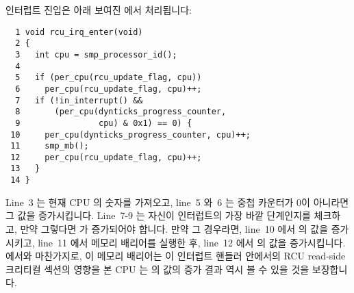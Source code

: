인터럽트 진입은 아래 보여진  에서 처리됩니다:
\iffalse

The \co{rcu_irq_enter()} and \co{rcu_irq_exit()}
functions handle interrupt/NMI entry and exit, respectively.
Of course, nested interrupts must also be properly accounted for.
The possibility of nested interrupts is handled by a second per-CPU
variable, \co{rcu_update_flag}, which is incremented upon
entry to an interrupt or NMI handler (in \co{rcu_irq_enter()})
and is decremented upon exit (in \co{rcu_irq_exit()}).
In addition, the pre-existing \co{in_interrupt()} primitive is
used to distinguish between an outermost or a nested interrupt/NMI.

Interrupt entry is handled by the \co{rcu_irq_enter()}
shown below:
\fi

{ \scriptsize
\begin{verbatim}
  1 void rcu_irq_enter(void)
  2 {
  3   int cpu = smp_processor_id();
  4
  5   if (per_cpu(rcu_update_flag, cpu))
  6     per_cpu(rcu_update_flag, cpu)++;
  7   if (!in_interrupt() &&
  8       (per_cpu(dynticks_progress_counter,
  9                cpu) & 0x1) == 0) {
 10     per_cpu(dynticks_progress_counter, cpu)++;
 11     smp_mb();
 12     per_cpu(rcu_update_flag, cpu)++;
 13   }
 14 }
\end{verbatim}
}

Line~3 는 현재 CPU 의 숫자를 가져오고, line~5 와~6 는  중첩
카운터가 0이 아니라면 그 값을 증가시킵니다.
Line~7-9 는 자신이 인터럽트의 가장 바깥 단계인지를 체크하고, 만약 그렇다면
 가 증가되어야 합니다.
만약 그 경우라면, line~10 에서  의 값을
증가시키고, line~11 에서 메모리 배리어를 실행한 후, line~12 에서
 의 값을 증가시킵니다.
 에서와 마찬가지로, 이 메모리 배리어는 이 인터럽트 핸들러
안에서의 RCU read-side 크리티컬 섹션의 영향을 본 CPU 는
 의 값의 증가 결과 역시 볼 수 있을 것을
보장합니다.
\iffalse

Line~3 fetches the current CPU's number, while lines~5 and~6
increment the \co{rcu_update_flag} nesting counter if it
is already non-zero.
Lines~7-9 check to see whether we are the outermost level of
interrupt, and, if so, \co{dynticks_progress_counter}
needs to be incremented.
If so, line~10 increments \co{dynticks_progress_counter},
line~11 executes a memory barrier, and line~12 increments
\co{rcu_update_flag}.
As with \co{rcu_exit_nohz()}, the memory barrier ensures that
any other CPU that sees the effects of an RCU read-side critical section
in the interrupt handler (following the \co{rcu_irq_enter()}
invocation) will also see the increment of
\co{dynticks_progress_counter}.
\fi

